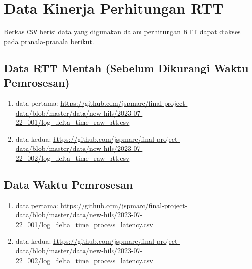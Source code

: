 \chapter{Data Kinerja Perhitungan RTT}\label{appendix-performance-data}
\setcounter{section}{0}

Berkas \texttt{CSV} berisi data yang digunakan dalam perhitungan RTT dapat
diakses pada pranala-pranala berikut.

\section{Data RTT Mentah (Sebelum Dikurangi Waktu Pemrosesan)}

\begin{enumerate}
	\item data pertama:
	      \url{https://github.com/jspmarc/final-project-data/blob/master/data/new-hils/2023-07-22_001/log_delta_time_raw_rtt.csv}
	\item data kedua:
	      \url{https://github.com/jspmarc/final-project-data/blob/master/data/new-hils/2023-07-22_002/log_delta_time_raw_rtt.csv}
\end{enumerate}

\section{Data Waktu Pemrosesan}

\begin{enumerate}
	\item data pertama:
	      \url{https://github.com/jspmarc/final-project-data/blob/master/data/new-hils/2023-07-22_001/log_delta_time_process_latency.csv}
	\item data kedua:
	      \url{https://github.com/jspmarc/final-project-data/blob/master/data/new-hils/2023-07-22_002/log_delta_time_process_latency.csv}
\end{enumerate}
